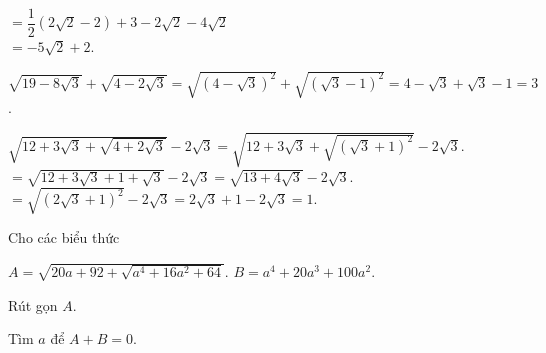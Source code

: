\begin{bt}
{\begin{listEX}
	$=\dfrac{1}{2}\left(2\sqrt{2}-2\right)+3-2\sqrt{2}-4\sqrt{2}$\\
	$=-5\sqrt{2}+2$.
	\item $\sqrt{19-8\sqrt{3}}+\sqrt{4-2\sqrt{3}}=\sqrt{(4-\sqrt{3})^2}+\sqrt{(\sqrt{3}-1)^2}=4-\sqrt{3}+\sqrt{3}-1=3$.
	\item $\sqrt{12+3\sqrt{3}+\sqrt{4+2\sqrt{3}}}-2\sqrt{3}=\sqrt{12+3\sqrt{3}+\sqrt{(\sqrt{3}+1)^2}}-2\sqrt{3}$.
	\\ $=\sqrt{12+3\sqrt{3}+1+\sqrt{3}}-2\sqrt{3}=\sqrt{13+4\sqrt{3}}-2\sqrt{3}$.
	\\ $=\sqrt{(2\sqrt{3}+1)^2}-2\sqrt{3}=2\sqrt{3}+1-2\sqrt{3}=1$.
	\end{listEX}}
\end{bt}
\begin{bt}
	Cho các biểu thức 
	\begin{center}
	$A= \sqrt{20a + 92 + \sqrt{a^4 + 16a^2 + 64}}$.
	$B= a^4 + 20a^3+100a^2$.
	\end{center}
	\begin{listEX}
	\item Rút gọn $A$.
	\item Tìm $a$ để $A+B=0$.
	\end{listEX}
\end{bt} 
